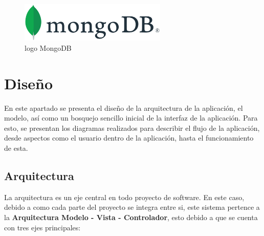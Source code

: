 \begin{figure}[H]
        \centering
        \includegraphics[width=7cm]{img/metodologia/MongoDB_Logo.svg.png}
        \caption{logo MongoDB}
        \label{fig:logoMongoDB}
    \end{figure}


\section{Dise\~no}

\noindent En este apartado se presenta el dise\~no de la arquitectura de la aplicaci\'on, el modelo, as\'i como un bosquejo sencillo inicial de la interfaz de la aplicaci\'on. Para esto, se presentan los diagramas realizados para describir el flujo de la aplicaci\'on, desde aspectos como el usuario dentro de la aplicaci\'on,  hasta el funcionamiento de esta.

\subsection{Arquitectura}
\noindent La arquitectura es un eje central en todo proyecto de software. En este caso, debido a  como cada parte del proyecto se integra entre si, este sistema pertence a la \textbf{Arquitectura Modelo - Vista - Controlador}, esto debido a que se cuenta con tres ejes principales:

